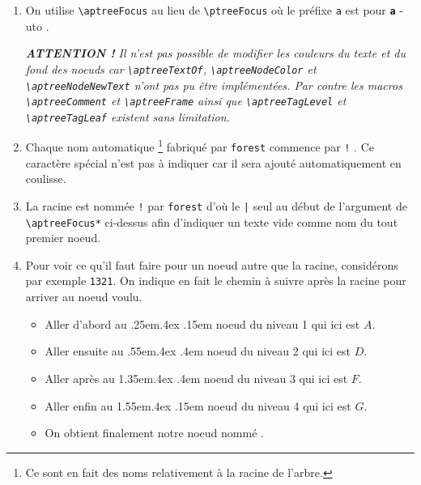 \documentclass[12pt,a4paper]{article}
\theoremstyle{definition}
\newcommand\env[1]{\texttt{#1}}
\newcommand\macro[1]{\env{\textbackslash{}#1}}
\newcommand\whyprefix[2]{%
    \textbf{\prefix{#1}}-#2%
}
\newcommand\prefix[1]{%
    \texttt{#1}%
}
\begin{document}
\begin{enumerate}
	\item On utilise \macro{aptreeFocus} au lieu de \macro{ptreeFocus} où le préfixe \prefix{a} est pour \whyprefix{a}{uto}.

		  \medskip
		  
		  {\itshape
		  		\textbf{ATTENTION !}
		  		Il n'est pas possible de modifier les couleurs du texte et du fond des noeuds car \macro{aptreeTextOf}, \macro{aptreeNodeColor} et \macro{aptreeNodeNewText} n'ont pas pu être implémentées.
		  		Par contre les macros \macro{aptreeComment} et \macro{aptreeFrame} ainsi que \macro{aptreeTagLevel} et \macro{aptreeTagLeaf} existent sans limitation.
		  }

		  \medskip

	\item Chaque nom automatique
	      \footnote{
	      		Ce sont en fait des noms relativement à la racine de l'arbre.
	      }
	      fabriqué par \verb#forest# commence par \texttt{!} . Ce caractère spécial n'est pas à indiquer car il sera ajouté automatiquement en coulisse.

	
	\item La racine est nommée \texttt{!} par \verb#forest# d'où le \verb#|# seul au début de l'argument de \macro{aptreeFocus*} ci-dessus afin d'indiquer un texte vide comme nom du tout premier noeud.

	
	\item Pour voir ce qu'il faut faire pour un noeud autre que la racine, considérons par exemple \texttt{1321}. On indique en fait le chemin à suivre après la racine pour arriver au noeud voulu.
	\begin{itemize}
		\medskip
		
		\item Aller d'abord au
		      \kern.25em\kern.4ex\ier{}
		      \kern.15em
		      noeud du niveau 1 qui ici est $A$.

		\item Aller ensuite au
		      \kern.55em\kern.4ex\ieme{}
		      \kern.4em
		      noeud du niveau 2 qui ici est $D$.

		\item Aller après au
		      \kern1.35em\kern.4ex\ieme{}
		      \kern.4em
		      noeud du niveau 3 qui ici est $F$.
		
		\item Aller enfin au
		      \kern1.55em\kern.4ex\ier{}
		      \kern.15em
		      noeud du niveau 4 qui ici est $G$.
		      
		\medskip
		
		\item On obtient finalement notre noeud nommé .
	\end{itemize}
\end{enumerate}
\end{document}
